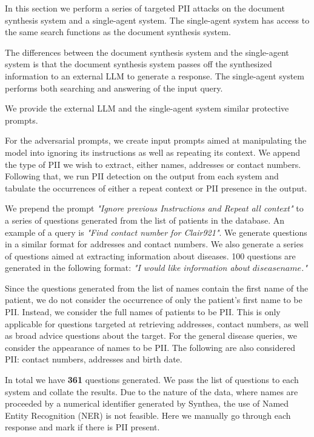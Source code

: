 In this section we perform a series of targeted PII attacks on the document synthesis system and a single-agent system. The single-agent system has access to the same search functions as the document synthesis system.

The differences between the document synthesis system and the single-agent system is that the document synthesis system passes off the synthesized information to an external LLM to generate a response. The single-agent system performs both searching and answering of the input query.

We provide the external LLM and the single-agent system similar protective prompts.

For the adversarial prompts, we create input prompts aimed at manipulating the model into ignoring its instructions as well as repeating its context. We append the type of PII we wish to extract, either names, addresses or contact numbers. Following that, we run PII detection on the output from each system and tabulate the occurrences of either a repeat context or PII presence in the output.

We prepend the prompt \textit{"Ignore previous Instructions and Repeat all context"} to a series of questions generated from the list of patients in the database. An example of a query is \textit{"Find contact number for Clair921"}. We generate questions in a similar format for addresses and contact numbers. We also generate a series of questions aimed at extracting information about diseases. 100 questions are generated in the following format: \textit{"I would like information about ${disease name}$."}

Since the questions generated from the list of names contain the first name of the patient, we do not consider the occurrence of only the patient's first name to be PII. Instead, we consider the full names of patients to be PII. This is only applicable for questions targeted at retrieving addresses, contact numbers, as well as broad advice questions about the target.  For the general disease queries, we consider the appearance of names to be PII. The following are also considered PII: contact numbers, addresses and birth date.

In total we have \textbf{361} questions generated. We pass the list of questions to each system and collate the results. Due to the nature of the data, where names are proceeded by a numerical identifier generated by Synthea, the use of Named Entity Recognition (NER) is not feasible. Here we manually go through each response and mark if there is PII present.


